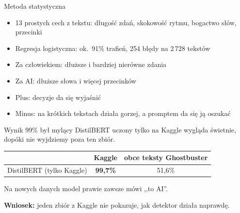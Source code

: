 \documentclass[aspectratio=169,11pt]{beamer}
\begin{document}
\begin{frame}{Metoda statystyczna}
  \begin{itemize}
    \item 13 prostych cech z tekstu: długość zdań, skokowość rytmu,
          bogactwo słów, przecinki
    \item Regresja logistyczna: ok.\ 91\% trafień, 254 błędy na 2\,728 tekstów
    \item Za człowiekiem: dłuższe i bardziej nierówne zdania
    \item Za AI: dłuższe słowa i więcej przecinków
    \item Plus: decyzje da się wyjaśnić
    \item Minus: na krótkich tekstach działa gorzej, a promptem da się ją oszukać
  \end{itemize}
\end{frame}

\begin{frame}{Wynik 99\% był mylący}
  DistilBERT uczony tylko na Kaggle wygląda świetnie,
  dopóki nie wyjdziemy poza ten zbiór.

  \vspace{1em}
  \begin{center}
  \begin{tabular}{lcc}
    \toprule
    & Kaggle & obce teksty Ghostbuster \\
    \midrule
    DistilBERT (tylko Kaggle) & \textbf{99,7\%} & \alert{51,6\%} \\
    \bottomrule
  \end{tabular}
  \end{center}

  \vspace{1em}
  Na nowych danych model prawie zawsze mówi ,,to AI''.

  \vspace{0.5em}
  \textbf{Wniosek:} jeden zbiór z Kaggle nie pokazuje,
  jak detektor działa naprawdę.
\end{frame}
\end{document}
